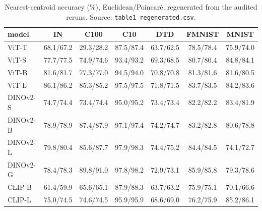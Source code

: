 \begin{table}[H]
\centering
\small
\begin{tabular}{lcccccc}
\toprule
model & IN & C100 & C10 & DTD & FMNIST & MNIST \\
\midrule
ViT-T & 68.1/67.2 & 29.3/28.2 & 87.5/87.4 & 63.7/62.5 & 78.5/78.4 & 75.9/74.0 \\
ViT-S & 77.7/77.5 & 74.9/74.6 & 93.4/93.2 & 69.3/68.5 & 80.7/80.4 & 84.8/84.1 \\
ViT-B & 81.6/81.7 & 77.3/77.0 & 94.5/94.0 & 70.8/70.8 & 81.3/81.6 & 81.6/80.5 \\
ViT-L & 86.1/86.2 & 85.3/85.2 & 97.5/97.5 & 71.8/71.5 & 83.7/83.5 & 84.2/83.6 \\
DINOv2-S & 74.7/74.4 & 73.4/74.4 & 95.0/95.2 & 73.4/73.4 & 82.2/82.2 & 83.4/81.9 \\
DINOv2-B & 78.9/78.9 & 87.4/87.9 & 97.1/97.4 & 74.2/74.7 & 83.2/82.8 & 80.6/78.8 \\
DINOv2-L & 79.8/80.4 & 85.6/87.7 & 97.9/98.3 & 74.4/75.2 & 84.4/84.5 & 74.1/72.7 \\
DINOv2-G & 78.4/78.3 & 89.8/91.0 & 97.8/98.2 & 72.9/73.1 & 85.9/85.8 & 79.3/78.6 \\
CLIP-B & 61.4/59.9 & 65.6/65.1 & 87.9/88.3 & 63.7/63.2 & 75.9/75.1 & 70.1/66.6 \\
CLIP-L & 75.0/74.5 & 74.6/74.5 & 95.9/95.9 & 68.6/69.0 & 76.2/75.9 & 85.2/86.1 \\
\bottomrule
\end{tabular}
\caption{Nearest-centroid accuracy (\%), Euclidean/Poincar\'e, regenerated from the audited reruns. Source: \texttt{table1\_regenerated.csv}.}
\label{tab:a2}
\end{table}
